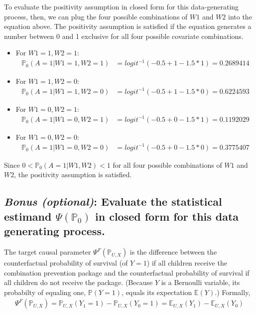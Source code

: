 \documentclass{article}\usepackage[]{graphicx}\usepackage[]{xcolor}
\begin{document}
To evaluate the positivity assumption in closed form for this data-generating process, then, we can plug the four possible combinations of $W1$ and $W2$ into the equation above. The positivity assumption is satisfied if the equation generates a number between 0 and 1 exclusive for all four possible covariate combinations.

\begin{itemize}
  
  \item For $W1=1, W2=1$:
\begin{align*}
\mathbb{P}_0(A=1|W1=1,W2=1) &= logit^{-1}(-0.5+1-1.5*1) = 0.2689414
\end{align*}

  \item For $W1=1, W2=0$:
\begin{align*}
\mathbb{P}_0(A=1|W1=1,W2=0) &= logit^{-1}(-0.5+1-1.5*0) = 0.6224593
\end{align*}

  \item For $W1=0, W2=1$:
\begin{align*}
\mathbb{P}_0(A=1|W1=0,W2=1) &= logit^{-1}(-0.5+0-1.5*1) = 0.1192029
\end{align*}

  \item For $W1=0, W2=0$:
\begin{align*}
\mathbb{P}_0(A=1|W1=0,W2=0) &= logit^{-1}(-0.5+0-1.5*0) = 0.3775407
\end{align*}
  
\end{itemize}

Since $0 < \mathbb{P}_0(A=1|W1,W2) < 1$ for all four possible combinations of $W1$ and $W2$, the positivity assumption is satisfied.


\newpage
  
\subsection{\textit{Bonus (optional)}: Evaluate the statistical estimand $\Psi(\mathbb{P}_0)$ in closed form for this data generating process.}

The target causal parameter $\Psi^F(\mathbb{P}_{U,X})$ is the difference between the counterfactual probability of survival (of $Y=1$) if all children receive the combination prevention package and the counterfactual probability of survival if all children do not receive the package. (Because $Y$ is a Bernoulli variable, its probabilty of equaling one, $\mathbb{P}(Y=1)$, equals its expectation $\mathbb{E}(Y)$.) Formally,
\begin{align*}
\Psi^F(\mathbb{P}_{U,X})=\mathbb{P}_{U,X}(Y_1=1)-\mathbb{P}_{U,X}(Y_0=1)=\mathbb{E}_{U,X}(Y_1)-\mathbb{E}_{U,X}(Y_0)
\end{align*}
\end{document}
